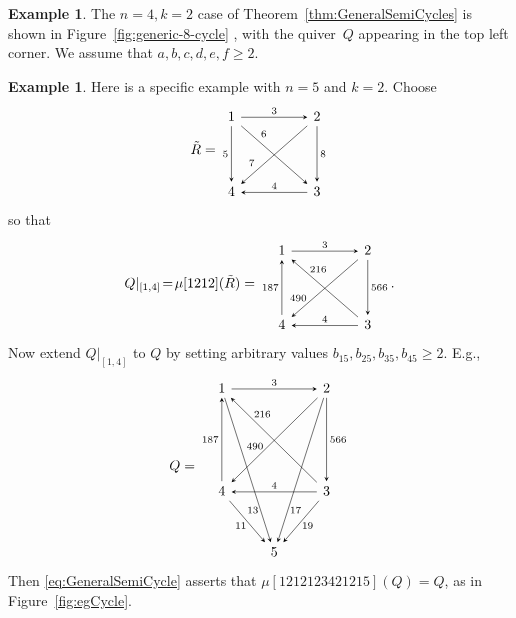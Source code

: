 \documentclass[11pt, letterpaper]{amsart}
\theoremstyle{definition}
\newtheorem{example}[theorem]{Example}
\numberwithin{equation}{section}
\newcommand{\T}[2]{\mu[#1](#2)} %
\begin{document}
\begin{example}
\label{eg:n=4,k=2}
The $n=4, k=2$ case of Theorem~\ref{thm:GeneralSemiCycles} is shown in Figure~\ref{fig:generic-8-cycle} , 
with the quiver~$Q$ appearing in the top left corner.
We assume that $a,b,c,d,e,f \geq 2$. 
\end{example}

\begin{example}
\label{eg:longcycle5}
Here is a specific example with $n=5$ and $k=2$. 
Choose 
\begin{equation*}
\tilde R=\begin{tikzcd}[arrows={-stealth}, row sep=40]
  1 \arrow[rr, "3"]  \arrow[rrd, near start, "6"] \arrow[d, swap, "5" ]
  && 2 \arrow[d, "8" ] \arrow[dll,swap, near end, "7"] 
  \\
4   && 3 \arrow[ll, swap, "4" ] 
\end{tikzcd}
\end{equation*}
so that
\begin{equation*}
Q|_{[1,4]}\!=\!\T{1212}{\tilde R} = \begin{tikzcd}[arrows={-stealth}, row sep=40]
  1 \arrow[rr, "3"]  
  && 2 \arrow[d, "566" ] \arrow[dll,swap, near end, outer sep=-1, "490"] 
  \\
4 \arrow[u, "187" ]  && 3 \arrow[ll, swap, "4" ] \arrow[llu, swap, near end, outer sep=-1, "216"] 
\end{tikzcd}
.
\end{equation*}
Now extend $Q|_{[1,4]}$ to $Q$ by setting arbitrary values $b_{15},b_{25}, b_{35},b_{45}\ge2$.
E.g., 
\begin{equation}
Q= \begin{tikzcd}[arrows={-stealth}, row sep=30]
  1 \arrow[rr, "3"]  \arrow[rddd, near end, swap, outer sep=-1.5, "13"]  
  && 2 \arrow[dd, "566" ] \arrow[ddll, swap, "490", pos=0.62, outer sep=-1.5] \arrow[lddd, near end, outer sep=-1.5, "17"]  
  \\
  \\
4 \arrow[uu, "187" ] \arrow[rd, swap, outer sep=-1.5, "11" ]  && 
       3 \arrow[ll, swap, "4" ] \arrow[lluu,  "216", swap, near end, outer sep=-1]  \arrow[ld, outer sep=-1.5, "19" ] 
\\
& 5
\end{tikzcd}
\end{equation}
Then \eqref{eq:GeneralSemiCycle} asserts that
$\T{1212123421215}{Q}=Q$, as in Figure~\ref{fig:egCycle}. 
\end{example}
 
\end{document}
